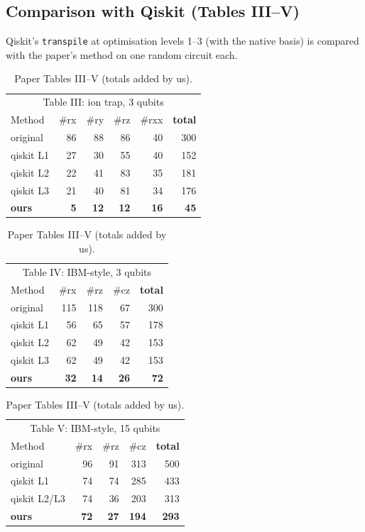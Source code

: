 \documentclass[11pt,a4paper]{article}
\begin{document}
\subsection{Comparison with Qiskit (Tables III--V)}
Qiskit's \texttt{transpile} at optimisation levels 1--3 (with the native basis) is compared with the paper's method on
one random circuit each.
\begin{table}[H]\centering\small
\begin{tabular}{l rrrr r}\toprule
\multicolumn{6}{c}{Table III: ion trap, 3 qubits}\\
Method&\#rx&\#ry&\#rz&\#rxx&\textbf{total}\\\midrule
original&86&88&86&40&300\\ qiskit L1&27&30&55&40&152\\ qiskit L2&22&41&83&35&181\\ qiskit L3&21&40&81&34&176\\
\textbf{ours}&\textbf{5}&\textbf{12}&\textbf{12}&\textbf{16}&\textbf{45}\\\bottomrule
\end{tabular}\hfill
\begin{tabular}{l rrr r}\toprule
\multicolumn{5}{c}{Table IV: IBM-style, 3 qubits}\\
Method&\#rx&\#rz&\#cz&\textbf{total}\\\midrule
original&115&118&67&300\\ qiskit L1&56&65&57&178\\ qiskit L2&62&49&42&153\\ qiskit L3&62&49&42&153\\
\textbf{ours}&\textbf{32}&\textbf{14}&\textbf{26}&\textbf{72}\\\bottomrule
\end{tabular}

\medskip
\begin{tabular}{l rrr r}\toprule
\multicolumn{5}{c}{Table V: IBM-style, 15 qubits}\\
Method&\#rx&\#rz&\#cz&\textbf{total}\\\midrule
original&96&91&313&500\\ qiskit L1&74&74&285&433\\ qiskit L2/L3&74&36&203&313\\
\textbf{ours}&\textbf{72}&\textbf{27}&\textbf{194}&\textbf{293}\\\bottomrule
\end{tabular}
\caption{Paper Tables III--V (totals added by us).}
\end{table}
\end{document}
